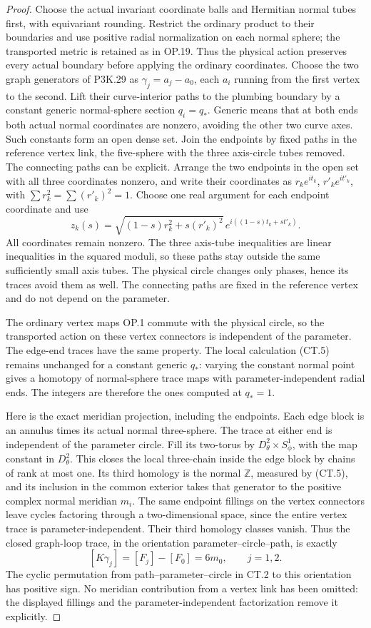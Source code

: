 \begin{proof}
Choose the actual invariant coordinate balls and Hermitian normal
tubes first, with equivariant rounding. Restrict the ordinary product
to their boundaries and use positive radial normalization on each
normal sphere; the transported metric is retained as in OP.19. Thus
the physical action preserves every actual boundary before applying
the ordinary coordinates. Choose the two graph generators of P3K.29 as
\(\gamma_j=a_j-a_0\), each \(a_i\) running from the first vertex
to the second. Lift their curve-interior paths to the plumbing
boundary by a constant generic normal-sphere section \(q_i=q_*\).
Generic means that at both ends both actual normal coordinates are
nonzero, avoiding the other two curve axes. Such constants form an
open dense set. Join the endpoints by fixed paths in the reference
vertex link, the five-sphere with the three axis-circle tubes
removed. The connecting paths can be explicit. Arrange the two
endpoints in the open set with all three coordinates nonzero, and
write their coordinates as \(r_ke^{it_k}\), \(r'_ke^{it'_k}\), with
\(\sum r_k^2=\sum(r'_k)^2=1\). Choose one real argument for each
endpoint coordinate and use
\[
 z_k(s)=\sqrt{(1-s)r_k^2+s(r'_k)^2}\,
                 e^{i((1-s)t_k+st'_k)}.
\]
All coordinates remain nonzero. The three axis-tube inequalities
are linear inequalities in the squared moduli, so these paths stay
outside the same sufficiently small axis tubes. The physical
circle changes only phases, hence its traces avoid them as well.
The connecting paths are fixed in the reference vertex and do not
depend on the parameter.

The ordinary vertex maps OP.1 commute with the physical circle, so
the transported action on these vertex connectors is independent
of the parameter. The edge-end traces have the same property. The
local calculation (CT.5) remains unchanged for a constant generic
\(q_*\): varying the constant normal point gives a homotopy of
normal-sphere trace maps with parameter-independent radial ends.
The integers are therefore the ones computed at \(q_*=1\).

Here is the exact meridian projection, including the endpoints.
Each edge block is an annulus times its actual normal three-sphere.
The trace at either end is independent of the parameter circle.
Fill its two-torus by \(D^2_\theta\times S^1_\phi\), with the map
constant in \(D^2_\theta\). This closes the local three-chain
inside the edge block by chains of rank at most one. Its third
homology is the normal \(\mathbb Z\), measured by (CT.5), and its
inclusion in the common exterior takes that generator to the
positive complex normal meridian \(m_i\). The same endpoint
fillings on the vertex connectors leave cycles factoring through
a two-dimensional space, since the entire vertex trace is
parameter-independent. Their third homology classes vanish.
Thus the closed graph-loop trace, in the orientation
parameter--circle--path, is exactly
\[
 [K\gamma_j]=[F_j]-[F_0]=6m_0,\qquad j=1,2.       \tag{CT.6}
\]
The cyclic permutation from path--parameter--circle in CT.2 to this
orientation has positive sign. No meridian contribution from a
vertex link has been omitted: the displayed fillings and the
parameter-independent factorization remove it explicitly.


\end{proof}
